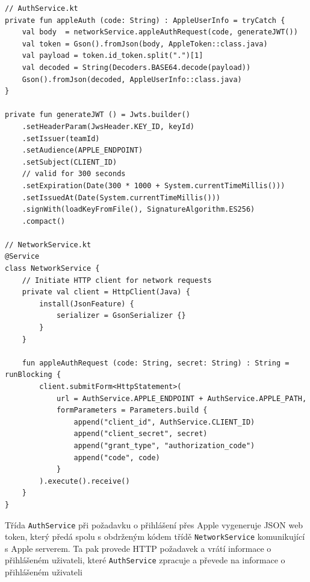 \begin{listing}[H]
\begin{verbatim}
// AuthService.kt
private fun appleAuth (code: String) : AppleUserInfo = tryCatch {
    val body  = networkService.appleAuthRequest(code, generateJWT())
    val token = Gson().fromJson(body, AppleToken::class.java)
    val payload = token.id_token.split(".")[1]
    val decoded = String(Decoders.BASE64.decode(payload))
    Gson().fromJson(decoded, AppleUserInfo::class.java)
}

private fun generateJWT () = Jwts.builder()
    .setHeaderParam(JwsHeader.KEY_ID, keyId)
    .setIssuer(teamId)
    .setAudience(APPLE_ENDPOINT)
    .setSubject(CLIENT_ID)
    // valid for 300 seconds
    .setExpiration(Date(300 * 1000 + System.currentTimeMillis()))
    .setIssuedAt(Date(System.currentTimeMillis()))
    .signWith(loadKeyFromFile(), SignatureAlgorithm.ES256)
    .compact()

// NetworkService.kt
@Service
class NetworkService {
    // Initiate HTTP client for network requests
    private val client = HttpClient(Java) {
        install(JsonFeature) {
            serializer = GsonSerializer {}
        }
    }

    fun appleAuthRequest (code: String, secret: String) : String = runBlocking {
        client.submitForm<HttpStatement>(
            url = AuthService.APPLE_ENDPOINT + AuthService.APPLE_PATH,
            formParameters = Parameters.build {
                append("client_id", AuthService.CLIENT_ID)
                append("client_secret", secret)
                append("grant_type", "authorization_code")
                append("code", code)
            }
        ).execute().receive()
    }
}
\end{verbatim}
\caption[Ukázka Service pro připojení k Apple serveru]{Třída \texttt{AuthService} při požadavku o přihlášení přes Apple vygeneruje JSON web token, který předá spolu s obdrženým kódem třídě  \texttt{NetworkService} komunikující s Apple serverem. Ta pak provede HTTP požadavek a vrátí informace o přihlášeném uživateli, které \texttt{AuthService} zpracuje a převede na informace o přihlášeném uživateli}
\end{listing}

